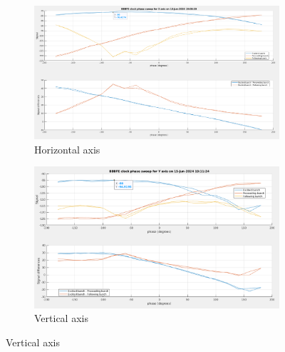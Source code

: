 \documentclass{report}
\begin{document}
\begin{figure}[hbt]
   \centering
    \begin{subfigure}[b]{0.45\textwidth}
        \includegraphics[width=\textwidth]{vlr_clock_phase_scan_x.png}
        \caption{Horizontal axis}
        \label{fig:clock_phase_example_x}
    \end{subfigure}
    \begin{subfigure}[b]{0.45\textwidth}
        \includegraphics[width=\textwidth]{vlr_clock_phase_scan_y.png}
        \caption{Vertical axis}
        \label{fig:clock_phase_example_y}
    \end{subfigure}
    

\end{figure}
\end{document}

